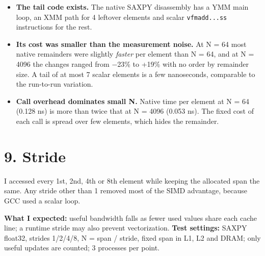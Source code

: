 \documentclass[10pt,letterpaper]{article}
\begin{document}
\begin{itemize}\setlength{\itemsep}{2pt}

\item \textbf{The tail code exists.} The native SAXPY disassembly has a YMM main loop, an XMM path for 4 leftover elements and scalar \texttt{vfmadd...ss} instructions for the rest.

\item \textbf{Its cost was smaller than the measurement noise.} At N = 64 most native remainders were slightly \textit{faster} per element than N = 64, and at N = 4096 the changes ranged from $-$23\% to +19\% with no order by remainder size. A tail of at most 7 scalar elements is a few nanoseconds, comparable to the run-to-run variation.

\item \textbf{Call overhead dominates small N.} Native time per element at N = 64 (0.128 ns) is more than twice that at N = 4096 (0.053 ns). The fixed cost of each call is spread over few elements, which hides the remainder.

\end{itemize}

\section*{9. Stride}

I accessed every 1st, 2nd, 4th or 8th element while keeping the allocated span the same. Any stride other than 1 removed most of the SIMD advantage, because GCC used a scalar loop.


\textbf{What I expected:} useful bandwidth falls as fewer used values share each cache line; a runtime stride may also prevent vectorization. \textbf{Test settings:} SAXPY float32, strides 1/2/4/8, N = span / stride, fixed span in L1, L2 and DRAM; only useful updates are counted; 3 processes per point.
\end{document}
